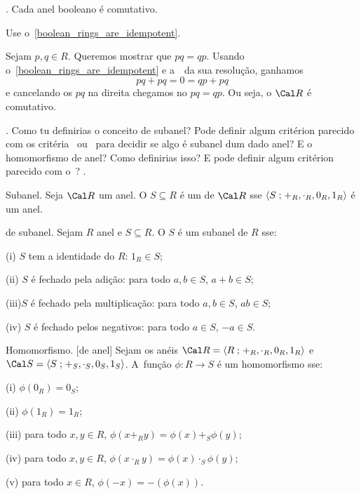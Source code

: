 \endexercise

\exercise.
\label{boolean_rings_are_commutative}%
Cada anel booleano é comutativo.

\hint
Use o~\ref{boolean_rings_are_idempotent}.

\solution
Sejam $p,q \in R$.
Queremos mostrar que $pq = qp$.
Usando o~\ref{boolean_rings_are_idempotent} e
a~~da sua resolução,
ganhamos
$$
pq + pq = 0 = qp + pq
$$
e cancelando os $pq$ na direita chegamos no $pq = qp$.
Ou seja, o $\cal R$ é comutativo.

\endexercise

\question.
Como tu definirias o conceito de subanel?
Pode definir algum critérion parecido com os critéria~
ou~ para decidir se algo é subanel dum dado anel?
E o homomorfismo de anel?  Como definirias isso?  E pode definir algum critérion
parecido com o~?
\spoiler.

 Subanel.
\label{subring}%
%
Seja $\cal R$ um anel.
O $S\subseteq R$ é um  de $\cal R$ sse
$\langle{S}\mathrel{;}{+_R, \cdot_R,0_R, 1_R}\rangle$ é um anel.

\criterion de subanel.
\label{subring_criterion}%
Sejam $R$ anel e $S \subseteq R$.
O $S$ é um subanel de $R$ sse:
\item{\rm (i)}  $S$ tem a identidade do $R$: $1_R \in S$;
\item{\rm (ii)} $S$ é fechado pela adição: para todo $a,b \in S$, $a+b \in S$;
\item{\rm (iii)}$S$ é fechado pela multiplicação: para todo $a,b \in S$, $ab \in S$;
\item{\rm (iv)} $S$ é fechado pelos negativos: para todo $a \in S$, $-a\in S$.

 Homomorfismo.
\label{ring_homomorphism}%
[de anel]%
Sejam os anéis
$\cal R = \sset R {+_R, \cdot_R, 0_R, 1_R}$ e
$\cal S = \sset S {+_S, \cdot_S, 0_S, 1_S}$.
A~função $\phi : R \to S$ é um homomorfismo sse:
\item{\rm (i)}   $\phi(0_R) = 0_S$;
\item{\rm (ii)}  $\phi(1_R) = 1_R$;
\item{\rm (iii)} para todo $x,y\in R$, $\phi(x+_R y) = \phi(x) +_S \phi(y)$;
\item{\rm (iv)}  para todo $x,y\in R$, $\phi(x\cdot_R y) = \phi(x) \cdot_S \phi(y)$;
\item{\rm (v)}   para todo $x\in R$, $\phi(-x) = -(\phi(x))$.

